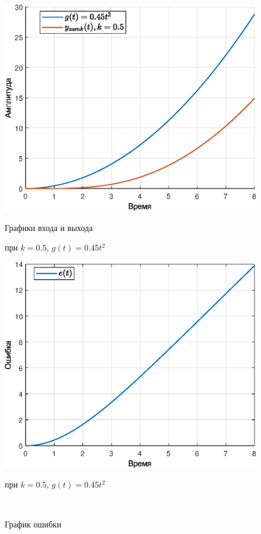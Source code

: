 \documentclass[a4paper]{article}
\begin{document}
\begin{figure}[H]
    \begin{minipage}{0.5\textwidth}
        \centering \includegraphics[width=\textwidth]{ex4/k0.5_g_at2.eps}
        \caption{Графики входа и выхода}
        \centerline{при $k=0.5$, $g(t)=0.45t^2$}
    \end{minipage}\hfill
    \begin{minipage}{0.5\textwidth}
        \centering \includegraphics[width=\textwidth]{ex4/k0.5_g_at2_error.eps}
        \caption{График ошибки}
        \centerline{при $k=0.5$, $g(t)=0.45t^2$}
    \end{minipage}\\[1em]
\end{figure}\noindent\
\end{document}
